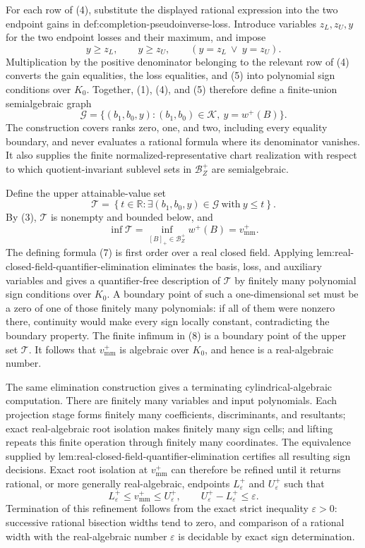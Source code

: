 For each row of (4), substitute the displayed rational expression into the two endpoint gains in def:completion-pseudoinverse-loss.  Introduce variables \(z_L,z_U,y\) for the two endpoint losses and their maximum, and impose
\[
y\ge z_L,\qquad y\ge z_U,\qquad
(y=z_L\ \vee\ y=z_U).
\tag{5}
\]
Multiplication by the positive denominator belonging to the relevant row of (4) converts the gain equalities, the loss equalities, and (5) into polynomial sign conditions over \(K_0\).  Together, (1), (4), and (5) therefore define a finite-union semialgebraic graph
\[
\mathcal G=
\{(b_1,b_0,y):(b_1,b_0)\in\mathcal K,\ y=w^+(B)\}.
\tag{6}
\]
The construction covers ranks zero, one, and two, including every equality boundary, and never evaluates a rational formula where its denominator vanishes.  It also supplies the finite normalized-representative chart realization with respect to which quotient-invariant sublevel sets in \(\mathcal B_Z^+\) are semialgebraic.

Define the upper attainable-value set
\[
\mathcal T=
\left\{t\in\mathbb R:
\exists(b_1,b_0,y)\in\mathcal G\ \text{with}\ y\le t
\right\}.
\tag{7}
\]
By (3), \(\mathcal T\) is nonempty and bounded below, and
\[
\inf\mathcal T
=\inf_{[B]_+\in\mathcal B_Z^+}w^+(B)
=v_{\mathrm{mm}}^+.
\tag{8}
\]
The defining formula (7) is first order over a real closed field.  Applying lem:real-closed-field-quantifier-elimination eliminates the basis, loss, and auxiliary variables and gives a quantifier-free description of \(\mathcal T\) by finitely many polynomial sign conditions over \(K_0\).  A boundary point of such a one-dimensional set must be a zero of one of those finitely many polynomials: if all of them were nonzero there, continuity would make every sign locally constant, contradicting the boundary property.  The finite infimum in (8) is a boundary point of the upper set \(\mathcal T\).  It follows that \(v_{\mathrm{mm}}^+\) is algebraic over \(K_0\), and hence is a real-algebraic number.

The same elimination construction gives a terminating cylindrical-algebraic computation.  There are finitely many variables and input polynomials.  Each projection stage forms finitely many coefficients, discriminants, and resultants; exact real-algebraic root isolation makes finitely many sign cells; and lifting repeats this finite operation through finitely many coordinates.  The equivalence supplied by lem:real-closed-field-quantifier-elimination certifies all resulting sign decisions.  Exact root isolation at \(v_{\mathrm{mm}}^+\) can therefore be refined until it returns rational, or more generally real-algebraic, endpoints \(L_\varepsilon^+\) and \(U_\varepsilon^+\) such that
\[
L_\varepsilon^+\le v_{\mathrm{mm}}^+\le U_\varepsilon^+,
\qquad
U_\varepsilon^+-L_\varepsilon^+\le\varepsilon.
\tag{9}
\]
Termination of this refinement follows from the exact strict inequality \(\varepsilon>0\): successive rational bisection widths tend to zero, and comparison of a rational width with the real-algebraic number \(\varepsilon\) is decidable by exact sign determination.

